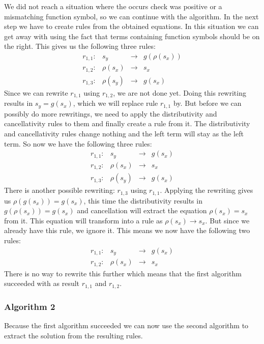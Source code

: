 We did not reach a situation where the occurs check was positive or a mismatching function symbol, so we can continue with the algorithm. In the next step we have to create rules from the obtained equations. In this situation we can get away with using the fact that terms containing function symbols should be on the right. This gives us the following three rules:
$$
\begin{array}{lrcl}
    r_{1,1}: & s_y & \rightarrow & g(\rho(s_x)) \\
    r_{1,2}: & \rho(s_x) & \rightarrow & s_x \\
    r_{1,3}: & \rho(s_y) & \rightarrow & g(s_x)
\end{array}
$$
Since we can rewrite $r_{1,1}$ using $r_{1,2}$, we are not done yet. Doing this rewriting results in $s_y = g(s_x)$, which we will replace rule $r_{1,1}$ by. But before we can possibly do more rewritings, we need to apply the distributivity and cancellativity rules to them and finally create a rule from it. The distributivity and cancellativity rules change nothing and the left term will stay as the left term. So now we have the following three rules:
$$
\begin{array}{lrcl}
    r_{1,1}: & s_y & \rightarrow & g(s_x) \\
    r_{1,2}: & \rho(s_x) & \rightarrow & s_x \\
    r_{1,3}: & \rho(s_y) & \rightarrow & g(s_x)
\end{array}
$$
There is another possible rewriting: $r_{1,3}$ using $r_{1,1}$. Applying the rewriting gives us $\rho(g(s_x)) = g(s_x)$, this time the distributivity results in $g(\rho(s_x)) = g(s_x)$ and cancellation will extract the equation $\rho(s_x) = s_x$ from it. This equation will transform into a rule as $\rho(s_x) \rightarrow s_x$. But since we already have this rule, we ignore it. This means we now have the following two rules:
$$
\begin{array}{lrcl}
    r_{1,1}: & s_y & \rightarrow & g(s_x) \\
    r_{1,2}: & \rho(s_x) & \rightarrow & s_x
\end{array}
$$
There is no way to rewrite this further which means that the first algorithm succeeded with as result $r_{1,1}$ and $r_{1,2}$.
\subsubsection{Algorithm 2}
Because the first algorithm succeeded we can now use the second algorithm to extract the solution from the resulting rules. 

